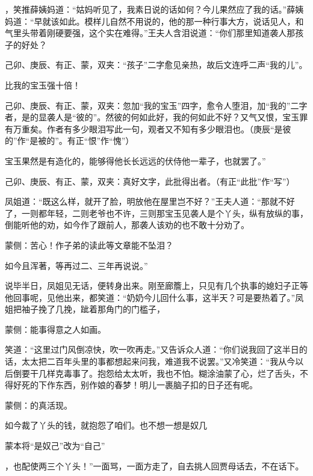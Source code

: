 \begin{parag}
，笑推薛姨妈道：“姑妈听见了，我素日说的话如何？今儿果然应了我的话。”薛姨妈道：“早就该如此。模样儿自然不用说的，他的那一种行事大方，说话见人，和气里头带着刚硬要强，这个实在难得。”王夫人含泪说道：“你们那里知道袭人那孩子的好处？\begin{note}己卯、庚辰、有正、蒙，双夹：“孩子”二字愈见亲热，故后文连呼二声“我的儿”。\end{note}比我的宝玉强十倍！\begin{note}己卯、庚辰、有正、蒙，双夹：忽加“我的宝玉”四字，愈令人堕泪，加“我的”二字者，是的显袭人是“彼的”。然彼的何如此好，我的何如此不好？又气又恨，宝玉罪有万重矣。作者有多少眼泪写此一句，观者又不知有多少眼泪也。（庚辰“是彼的”作“是被的”。有正“恨”作“愧”）\end{note}宝玉果然是有造化的，能够得他长长远远的伏侍他一辈子，也就罢了。”\begin{note}己卯、庚辰、有正、蒙，双夹：真好文字，此批得出者。（有正“此批”作“写”）\end{note}凤姐道：“既这么样，就开了脸，明放他在屋里岂不好？”王夫人道：“那就不好了，一则都年轻，二则老爷也不许，三则那宝玉见袭人是个丫头，纵有放纵的事，倒能听他的劝，如今作了跟前人，那袭人该劝的也不敢十分劝了。\begin{note}蒙侧：苦心！作子弟的读此等文章能不坠泪？\end{note}如今且浑著，等再过二、三年再说说。”
\end{parag}


\begin{parag}
    说毕半日，凤姐见无话，便转身出来。刚至廊簷上，只见有几个执事的媳妇子正等他回事呢，见他出来，都笑道：“奶奶今儿回什么事，这半天？可是要热着了。”凤姐把袖子挽了几挽，跐着那角门的门槛子，\begin{note}蒙侧：能事得意之人如画。\end{note}笑道：“这里过门风倒凉快，吹一吹再走。”又告诉众人道：“你们说我回了这半日的话，太太把二百年头里的事都想起来问我，难道我不说罢。”又冷笑道：“我从今以后倒要干几样克毒事了。抱怨给太太听，我也不怕。糊涂油蒙了心，烂了舌头，不得好死的下作东西，别作娘的春梦！明儿一裹脑子扣的日子还有呢。\begin{note}蒙侧：的真活现。\end{note}如今裁了丫头的钱，就抱怨了咱们。也不想一想是奴几\begin{note}蒙本将“是奴己”改为“自己”\end{note}，也配使两三个丫头！”一面骂，一面方走了，自去挑人回贾母话去，不在话下。
\end{parag}


